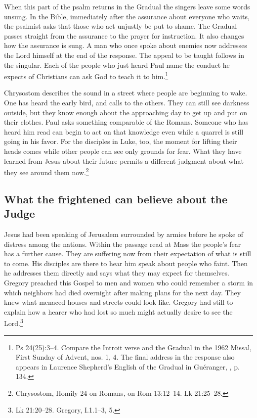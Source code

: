 When this part of the psalm returns in the Gradual the singers leave some words unsung. In the Bible, immediately after the assurance about everyone who waits, the psalmist asks that those who act unjustly be put to shame. The Gradual passes straight from the assurance to the prayer for instruction. It also changes how the assurance is sung. A man who once spoke about enemies now addresses the Lord himself at the end of the response. The appeal to be taught follows in the singular. Each of the people who just heard Paul name the conduct he expects of Christians can ask God to teach it to him.\footnote{Ps 24(25):3--4. Compare the Introit verse and the Gradual in the 1962 Missal, First Sunday of Advent, nos. 1, 4. The final address in the response also appears in Laurence Shepherd's English of the Gradual in Guéranger, , p. 134.}

Chrysostom describes the sound in a street where people are beginning to wake. One has heard the early bird, and calls to the others. They can still see darkness outside, but they know enough about the approaching day to get up and put on their clothes. Paul asks something comparable of the Romans. Someone who has heard him read can begin to act on that knowledge even while a quarrel is still going in his favor. For the disciples in Luke, too, the moment for lifting their heads comes while other people can see only grounds for fear. What they have learned from Jesus about their future permits a different judgment about what they see around them now.\footnote{Chrysostom, Homily 24 on Romans, on Rom 13:12--14. Lk 21:25--28.}

\subsection{What the frightened can believe about the Judge}

Jesus had been speaking of Jerusalem surrounded by armies before he spoke of distress among the nations. Within the passage read at Mass the people's fear has a further cause. They are suffering now from their expectation of what is still to come. His disciples are there to hear him speak about people who faint. Then he addresses them directly and says what they may expect for themselves. Gregory preached this Gospel to men and women who could remember a storm in which neighbors had died overnight after making plans for the next day. They knew what menaced houses and streets could look like. Gregory had still to explain how a hearer who had lost so much might actually desire to see the Lord.\footnote{Lk 21:20--28. Gregory,  I.1.1--3, 5.}


